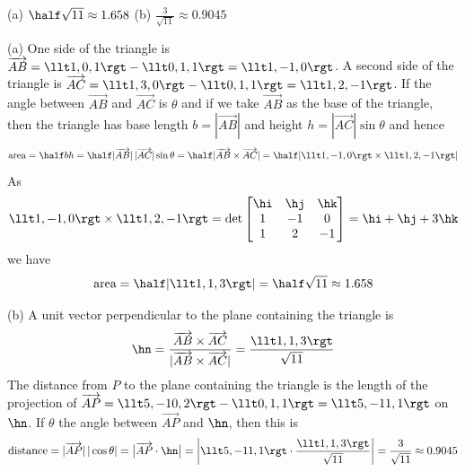 
\begin{answer}
(a) $\half\sqrt{11}\approx 1.658$\qquad
(b) $\frac{3}{\sqrt{11}}\approx 0.9045$
\end{answer}

\begin{solution}
(a) One side of the triangle is 
      $\overrightarrow{AB}=\llt 1,0,1\rgt - \llt 0,1,1\rgt = \llt 1,-1,0\rgt$.
A second side of the triangle is 
      $\overrightarrow{AC}=\llt 1,3,0\rgt - \llt 0,1,1\rgt = \llt 1,2,-1\rgt$.
If the angle between $\overrightarrow{AB}$ and $\overrightarrow{AC}$
is $\theta$ and if we take $\overrightarrow{AB}$ as the base of the triangle,
then the triangle has base length $b=|\overrightarrow{AB}|$
and height $h=|\overrightarrow{AC}|\sin\theta$ and hence
\begin{equation*}
\text{area}=\half bh
=\half |\overrightarrow{AB}|\,|\overrightarrow{AC}|\sin\theta
=\half|\overrightarrow{AB}\times\overrightarrow{AC}|
=\half|\llt 1,-1,0\rgt \times \llt 1,2,-1\rgt|
\end{equation*}
As
\begin{equation*}
\llt 1,-1,0\rgt\times\llt 1,2,-1\rgt
=\det\left[\begin{matrix}
           \hi & \hj & \hk \\
            1  &  -1  &  0 \\
            1  &  2   &  -1
  \end{matrix}\right]
=\hi+\hj+3\hk
\end{equation*}
we have 
\begin{equation*}
\text{area}=\half|\llt 1,1,3\rgt|=\half\sqrt{11}\approx 1.658
\end{equation*}

(b) A unit vector perpendicular to the plane containing the 
triangle is
\begin{equation*}
\hn=\frac{\overrightarrow{AB}\times\overrightarrow{AC}}
            {|\overrightarrow{AB}\times\overrightarrow{AC}|}
=\frac{\llt 1,1,3\rgt}{\sqrt{11}}
\end{equation*}
The distance from $P$ to the plane containing the triangle is
the length of the projection of 
$\overrightarrow{AP}=\llt 5,-10,2\rgt-\llt 0,1,1\rgt
               =\llt 5,-11,1\rgt$ 
on $\hn$. If $\theta$ the angle between $\overrightarrow{AP}$
and $\hn$, then this is
\begin{equation*}
\text{distance}= |\overrightarrow{AP}|\,|\cos\theta| 
=\big|\overrightarrow{AP}\cdot\hn\big|
=\left|\llt 5,-11,1\rgt\cdot\frac{\llt 1,1,3\rgt}{\sqrt{11}}\right|
=\frac{3}{\sqrt{11}}\approx 0.9045
\end{equation*}
\end{solution}


